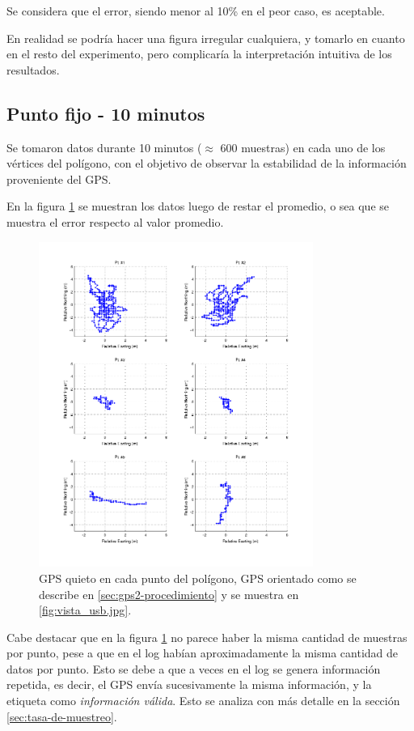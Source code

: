 \documentclass[spanish,12pt,a4paper,titlepage]{report}
\begin{document}
Se considera que el error, siendo  menor al 10\% en el peor caso, es aceptable.

En realidad se podría hacer una figura irregular cualquiera, y tomarlo en cuanto en el resto del experimento, pero complicaría la interpretación intuitiva de los resultados.

\newpage
\subsection{Punto fijo - 10 minutos}
\label{sec:gps2-punto-fijo-10-minutos}

Se tomaron datos durante 10 minutos ($\approx$ 600 muestras) en cada uno de los vértices del polígono, con el objetivo de observar la estabilidad de la información proveniente del GPS.

En la figura \ref{fig:10min_grid.png} se muestran los datos luego de restar el promedio, o sea que se muestra el error respecto al valor promedio.

\begin{figure}[h!]
  \includegraphics[width=0.8\textwidth]{./img/10min_grid.png}
  \caption{GPS quieto en cada punto del polígono, GPS orientado como se describe en \ref{sec:gps2-procedimiento} y se muestra en \ref{fig:vista_usb.jpg}.}
  \label{fig:10min_grid.png}
\end{figure}

Cabe destacar que en la figura \ref{fig:10min_grid.png} no parece haber la misma cantidad de muestras por punto, pese a que en el log habían aproximadamente la misma cantidad de datos por punto. Esto se debe a que a veces en el log se genera información repetida, es decir, el GPS envía sucesivamente la misma información, y la etiqueta como \textit{información válida}. Esto se analiza con más detalle en la sección \ref{sec:tasa-de-muestreo}.
\end{document}
